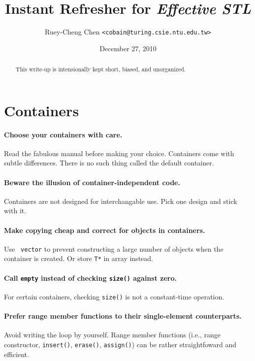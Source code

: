 \documentclass{article}
\begin{document}
\author{Ruey-Cheng Chen {\tt <cobain@turing.csie.ntu.edu.tw>}}
\title{Instant Refresher for {\it Effective STL}}
\date{December 27, 2010}
\maketitle

\begin{abstract}
This write-up is intensionally kept short, biased, and unorganized.
\end{abstract}

\begin{htmlonly}
  \tableofchildlinks
\end{htmlonly}

\section{Containers}

\paragraph{Choose your containers with care.}  Read the fabulous manual before
making your choice.  Containers come with subtle differences.  There is no such
thing called the default container.

\paragraph{Beware the illusion of container-independent code.} Containers are
not designed for interchangable use.  Pick one design and stick with it.

\paragraph{Make copying cheap and correct for objects in containers.} Use {\tt
vector} to prevent constructing a large number of objects
when the container is created.  Or store {\tt T*} in array instead.

\paragraph{Call {\tt empty} instead of checking {\tt size()} against zero.} For
certain containers, checking {\tt size()} is not a constant-time operation.

\paragraph{Prefer range member functions to their single-element counterparts.}
Avoid writing the loop by yourself.  Range member functions (i.e., range
constructor, {\tt insert()}, {\tt erase()}, {\tt assign()}) can be rather
straightfoward and efficient.  
\end{document}
